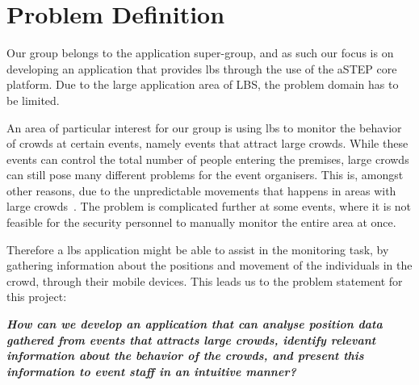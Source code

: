 \section{Problem Definition} \label{sec:problem_def}
Our group belongs to the application super-group, and as such our focus is on developing an application that provides \gls{lbs} through the use of the aSTEP core platform. Due to the large application area of LBS, the problem domain has to be limited. 

An area of particular interest for our group is using \gls{lbs} to monitor the behavior of crowds at certain events, namely events that attract large crowds. While these events can control the total number of people entering the premises, large crowds can still pose many different problems for the event organisers. This is, amongst other reasons, due to the unpredictable movements that happens in areas with large crowds~\cite{wirz2012inferring}. The problem is complicated further at some events, where it is not feasible for the security personnel to manually monitor the entire area at once. 

Therefore a \gls{lbs} application might be able to assist in the monitoring task, by gathering information about the positions and movement of the individuals in the crowd, through their mobile devices. This leads us to the problem statement for this project:

\vspace{0.5 cm}
\begin{center}
	\textbf{\textit{How can we develop an application that can analyse position data gathered from events that attracts large crowds, identify relevant information about the behavior of the crowds, and present this information to event staff in an intuitive manner?}}
\end{center}